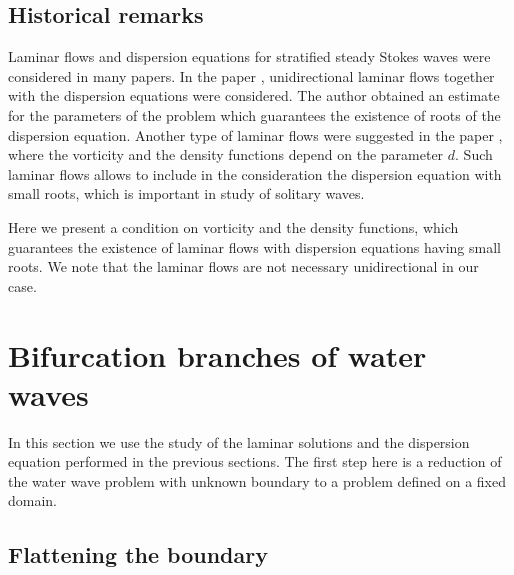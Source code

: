 \documentclass[a4paper,reqno,12pt]{amsart}
\theoremstyle{plain}
\theoremstyle{definition}
\numberwithin{equation}{section}
\begin{document}
\subsection{Historical remarks}

Laminar flows and dispersion equations for stratified steady Stokes waves were considered in many papers.
In the paper \cite{Wal},  unidirectional laminar flows together with the dispersion equations were considered. The author obtained an estimate for the parameters of the problem which guarantees the existence of roots of the dispersion equation.
Another type of laminar flows were suggested in the paper \cite{W2}, where the vorticity and the density functions  depend on the parameter $d$. Such laminar flows allows to include in the consideration the dispersion equation with small roots, which is important in study of solitary waves.

Here we present a condition on vorticity and the density functions, which guarantees the existence of laminar flows with dispersion equations having small roots. We note that the  laminar flows are not necessary unidirectional in our case.

\section{Bifurcation branches of water waves}

In this section we use the study of the laminar solutions and the dispersion equation
performed in the previous sections. The first step here is a reduction of the water wave problem with unknown boundary to a problem defined on a fixed domain.



\subsection{Flattening the boundary}\label{SOkt13b}
\end{document}
